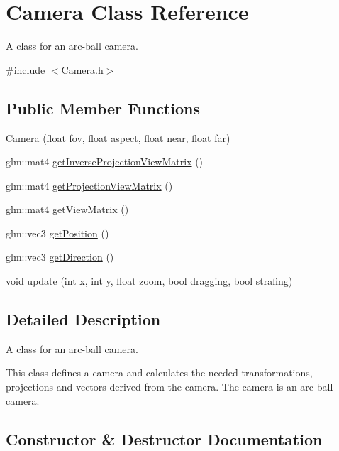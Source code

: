\hypertarget{class_camera}{}\section{Camera Class Reference}
\label{class_camera}


A class for an arc-\/ball camera.  




{\ttfamily \#include $<$Camera.\+h$>$}

\subsection*{Public Member Functions}
\begin{DoxyCompactItemize}
\item 
\mbox{\hyperlink{class_camera_a629e8f136bc671a3656e0e4076d91e20}{Camera}} (float fov, float aspect, float near, float far)
\item 
glm\+::mat4 \mbox{\hyperlink{class_camera_a2aca72ef1c9e0df76e49201b6554a1f8}{get\+Inverse\+Projection\+View\+Matrix}} ()
\item 
glm\+::mat4 \mbox{\hyperlink{class_camera_a6e72edaca7d7d8936b29071789a26bd8}{get\+Projection\+View\+Matrix}} ()
\item 
glm\+::mat4 \mbox{\hyperlink{class_camera_a5569ca5967e01d3344fbf6aba36d9820}{get\+View\+Matrix}} ()
\item 
glm\+::vec3 \mbox{\hyperlink{class_camera_a520c5a7413b3e704f2f442288db17bcf}{get\+Position}} ()
\item 
glm\+::vec3 \mbox{\hyperlink{class_camera_af43375ba08befa64bd6afc4814397f99}{get\+Direction}} ()
\item 
void \mbox{\hyperlink{class_camera_acd5ade904503464975261b9950c778c7}{update}} (int x, int y, float zoom, bool dragging, bool strafing)
\end{DoxyCompactItemize}


\subsection{Detailed Description}
A class for an arc-\/ball camera. 

This class defines a camera and calculates the needed transformations, projections and vectors derived from the camera. The camera is an arc ball camera. 

\subsection{Constructor \& Destructor Documentation}
\mbox{\label{class_camera_a629e8f136bc671a3656e0e4076d91e20}} 
